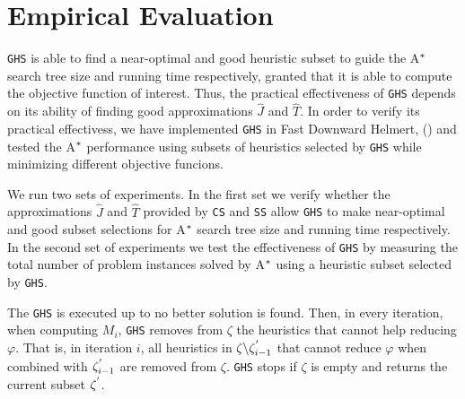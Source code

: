 



\chapter{Empirical Evaluation}\label{ch:empirical_evaluation}
\noindent
\texttt{GHS} is able to find a near-optimal and good heuristic subset to guide the A$\sp{*}$ search tree size and running time respectively, granted that it is able to compute the objective function of interest. Thus, the practical effectiveness of \texttt{GHS} depends on its ability of finding good approximations $\hat{J}$ and $\hat{T}$. In order to verify its practical effectivess, we have implemented \texttt{GHS} in Fast Downward Helmert, (\citeyear{helmert2006fast}) and tested the A$\sp{*}$ performance using subsets of heuristics selected by \texttt{GHS} while minimizing different objective funcions.

We run two sets of experiments. In the first set we verify whether the approximations $\hat{J}$ and $\hat{T}$ provided by \texttt{CS} and \texttt{SS} allow \texttt{GHS} to make near-optimal and good subset selections for A$\sp{*}$ search tree size and running time respectively. In the second set of experiments we test the effectiveness of \texttt{GHS} by measuring the total number of problem instances solved by A$\sp{*}$ using a heuristic subset selected by \texttt{GHS}.

The \texttt{GHS} is executed up to no better solution is found. Then, in every iteration, when computing $M_{i}$, \texttt{GHS} removes from $\zeta$ the heuristics that cannot help reducing $\varphi$. That is, in iteration $i$, all heuristics in $\zeta \backslash \zeta_{i-1}\sp{'}$ that cannot reduce $\varphi$ when combined with $\zeta_{i-1}\sp{'}$ are removed from $\zeta$. \texttt{GHS} stops if $\zeta$ is empty and returns the current subset $\zeta\sp{'}$.

